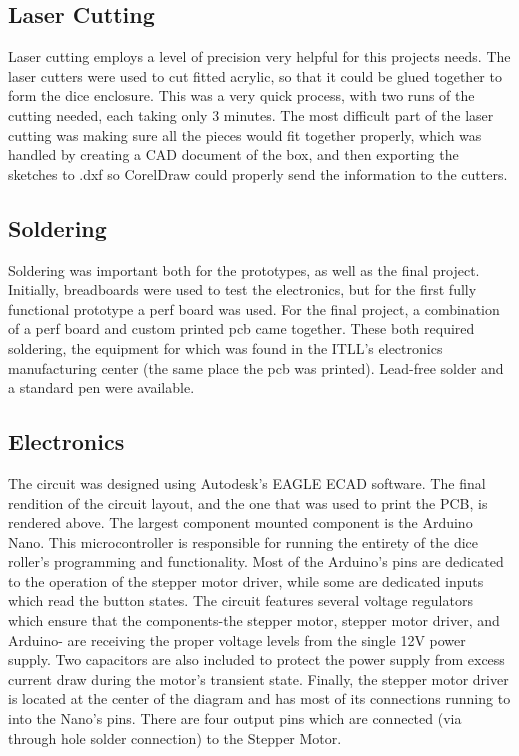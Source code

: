 \documentclass[12pt]{article}
\begin{document}
\subsection{Laser Cutting}
Laser cutting employs a level of precision very helpful for this projects needs. The laser cutters were used to cut fitted acrylic, so that it could be glued together to form the dice enclosure. This was a very quick process, with two runs of the cutting needed, each taking only 3 minutes. The most difficult part of the laser cutting was making sure all the pieces would fit together properly, which was handled by creating a CAD document of the box, and then exporting the sketches to .dxf so CorelDraw could properly send the information to the cutters.

\subsection{Soldering}
Soldering was important both for the prototypes, as well as the final project. Initially, breadboards were used to test the electronics, but for the first fully functional prototype a perf board was used. For the final project, a combination of a perf board and custom printed pcb came together. These both required soldering, the equipment for which was found in the ITLL's electronics manufacturing center (the same place the pcb was printed). Lead-free solder and a standard pen were available.

\subsection{Electronics}

The circuit was designed using Autodesk's EAGLE ECAD software. The final rendition of the circuit layout, and the one that was used to print the PCB, is rendered above. The largest component mounted component is the Arduino Nano. This microcontroller is responsible for running the entirety of the dice roller's programming and functionality. Most of the Arduino's pins are dedicated to the operation of the stepper motor driver, while some are dedicated inputs which read the button states. The circuit features several voltage regulators which ensure that the components-the stepper motor, stepper motor driver, and Arduino- are receiving the proper voltage levels from the single 12V power supply. Two capacitors are also included to protect the power supply from excess current draw during the motor's transient state. Finally, the stepper motor driver is located at the center of the diagram and has most of its connections running to into the Nano's pins. There are four output pins which are connected (via through hole solder connection) to the Stepper Motor. 
\end{document}
